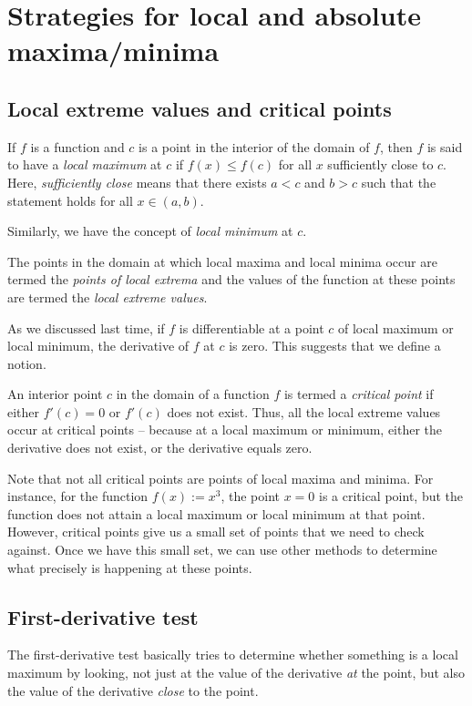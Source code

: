 \documentclass[10pt]{amsart}
\begin{document}
\section{Strategies for local and absolute maxima/minima}

\subsection{Local extreme values and critical points}

If $f$ is a function and $c$ is a point in the interior of the domain
of $f$, then $f$ is said to have a {\em local maximum} at $c$ if $f(x)
\le f(c)$ for all $x$ sufficiently close to $c$. Here, {\em
sufficiently close} means that there exists $a < c$ and $b > c$ such
that the statement holds for all $x \in (a,b)$.

Similarly, we have the concept of {\em local minimum} at $c$.

The points in the domain at which local maxima and local minima occur
are termed the {\em points of local extrema} and the values of the
function at these points are termed the {\em local extreme values}.

As we discussed last time, if $f$ is differentiable at a point $c$ of
local maximum or local minimum, the derivative of $f$ at $c$ is
zero. This suggests that we define a notion.

An interior point $c$ in the domain of a function $f$ is termed a {\em
critical point} if either $f'(c) = 0$ or $f'(c)$ does not exist. Thus,
all the local extreme values occur at critical points -- because at a
local maximum or minimum, either the derivative does not exist, or the
derivative equals zero.

Note that not all critical points are points of local maxima and
minima. For instance, for the function $f(x) := x^3$, the point $x =
0$ is a critical point, but the function does not attain a local
maximum or local minimum at that point. However, critical points give
us a small set of points that we need to check against. Once we have
this small set, we can use other methods to determine what precisely
is happening at these points.

\subsection{First-derivative test}

The first-derivative test basically tries to determine whether
something is a local maximum by looking, not just at the value of the
derivative {\em at} the point, but also the value of the derivative
{\em close} to the point.
\end{document}
